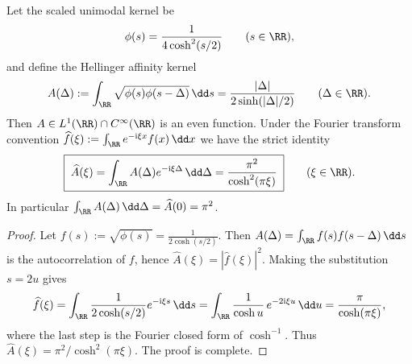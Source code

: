 %

\begin{proposition}\label{prop:xi-hellinger-kernel-fourier-sech2}
Let the scaled unimodal kernel be
\[
\phi(s)=\frac{1}{4\cosh^{2}(s/2)}\qquad(s\in\RR),
\]
and define the Hellinger affinity kernel
\[
A(\Delta):=\int_{\RR}\sqrt{\phi(s)\phi(s-\Delta)}\,\dd s
=\frac{|\Delta|}{2\sinh(|\Delta|/2)}\qquad(\Delta\in\RR).
\]
Then \(A\in L^{1}(\RR)\cap C^\infty(\RR)\) is an even function.
Under the Fourier transform convention
\(
\widehat f(\xi):=\int_{\RR}e^{-\mathrm{i}\xi x}f(x)\,\dd x
\)
we have the strict identity
\[
\boxed{\;
\widehat A(\xi)=\int_{\RR}A(\Delta)e^{-\mathrm{i}\xi\Delta}\,\dd\Delta
=\frac{\pi^{2}}{\cosh^{2}(\pi\xi)}\;}
\qquad(\xi\in\RR).
\]
In particular
\(
\int_{\RR}A(\Delta)\,\dd\Delta=\widehat A(0)=\pi^{2}
\).
\end{proposition}
\begin{proof}
Let
\(
f(s):=\sqrt{\phi(s)}=\frac{1}{2\cosh(s/2)}
\).
Then
\(
A(\Delta)=\int_{\RR}f(s)f(s-\Delta)\,\dd s
\)
is the autocorrelation of \(f\), hence \(\widehat A(\xi)=|\widehat f(\xi)|^{2}\).
Making the substitution \(s=2u\) gives
\[
\widehat f(\xi)
=\int_{\RR}\frac{1}{2\cosh(s/2)}e^{-\mathrm{i}\xi s}\,\dd s
=\int_{\RR}\frac{1}{\cosh u}\,e^{-2\mathrm{i}\xi u}\,\dd u
=\frac{\pi}{\cosh(\pi\xi)},
\]
where the last step is the Fourier closed form of \(\cosh^{-1}\).
Thus \(\widehat A(\xi)=\pi^{2}/\cosh^{2}(\pi\xi)\). The proof is complete.
\end{proof}

